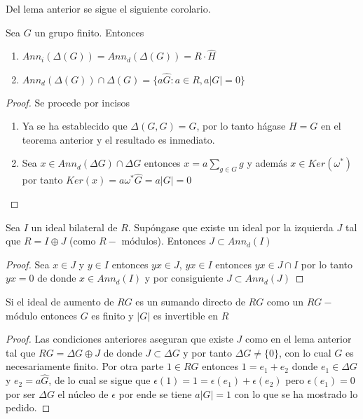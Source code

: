 Del lema anterior se sigue el siguiente corolario.

\begin{corolario}
Sea $G$ un grupo finito. Entonces 

\begin{enumerate}
\item $Ann_i (\Delta(G)) = Ann_d(\Delta(G)) = R\cdot \hat{H}$
\item $Ann_d(\Delta(G)) \cap \Delta (G) = \{ a\hat{G} : a \in R , a|G| = 0\}$ 
\end{enumerate}
\end{corolario}


\begin{proof}
Se procede por incisos
\begin{enumerate}
\item Ya se ha establecido que $\Delta(G,G) = G$, por lo tanto hágase $H=G$ en el teorema anterior y el resultado es inmediato.
\item Sea $x \in Ann_d(\Delta G) \cap \Delta G$ entonces $x = a\sum_{g\in G}g$ y además $x \in Ker(\omega^*)$ por tanto $Ker(x)= a\omega^*\hat{G} = a|G| = 0 $ \qedhere
\end{enumerate}
\end{proof}


\begin{lema}
Sea $I$ un ideal bilateral de $R$. Supóngase que existe un ideal por la izquierda $J$ tal que $R = I \oplus J$ (como $R-$ módulos). Entonces $J \subset Ann_d(I) $
\end{lema}

\begin{proof}
Sea $x \in J$ y $y \in I $ entonces $yx \in J$, $yx \in I$ entonces $yx \in J\cap I$ por lo tanto $yx=0$ de donde $x \in Ann_d(I)$ y por consiguiente $J \subset Ann_d(J)$ \qedhere 
\end{proof}

\begin{lema}\label{aumento}
Si el ideal de aumento de $RG$ es un sumando directo de $RG$ como un $RG-$módulo entonces $G$ es finito y $|G|$ es invertible en $R$
\end{lema}

\begin{proof}
Las condiciones anteriores aseguran que existe $J$ como en el lema anterior tal que $RG = \Delta G \oplus J$ de donde $J \subset \Delta G$  y por tanto $\Delta G \neq \{ 0 \}$, con lo cual $G$ es necesariamente finito.
Por otra parte $1 \in RG$ entonces $1 = e_1 + e_2$ donde $e_1 \in \Delta G$ y $e_2=a\hat{G}$, de lo cual se sigue que $\epsilon(1) = 1 = \epsilon(e_1) + \epsilon(e_2)$ pero $\epsilon(e_1) = 0$ por ser $\Delta G$ el núcleo de $\epsilon$ por ende se tiene $a|G| = 1$ con lo que se ha mostrado lo pedido. \qedhere
\end{proof}

